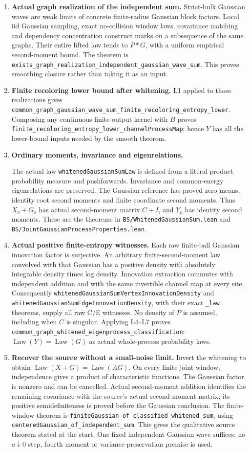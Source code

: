 \documentclass[11pt]{article}
\newcommand{\Law}{\operatorname{Law}}
\newcommand{\lean}[1]{{\small\nolinkurl{#1}}}
\begin{document}
\begin{enumerate}
\item \textbf{Actual graph realization of the independent sum.}
Strict-bulk Gaussian waves are weak limits of concrete finite-radius
Gaussian block factors. Local iid Gaussian sampling, exact no-collision
window laws, covariance matching and dependency concentration construct
marks on a subsequence of the same graphs. Their entire lifted law tends
to $P*G$, with a uniform empirical second-moment bound. The theorem is
\lean{exists_graph_realization_independent_gaussian_wave_sum}. This proves
smoothing closure rather than taking it as an input.
\item \textbf{Finite recoloring lower bound after whitening.}
L1 applied to those realizations gives
\lean{common_graph_gaussian_wave_sum_finite_recoloring_entropy_lower}.
Composing any continuous finite-output kernel with $B$ proves
\lean{finite_recoloring_entropy_lower_channelProcessMap}; hence $Y$ has
all the lower-bound inputs needed by the smooth theorem.
\item \textbf{Ordinary moments, invariance and eigenrelations.}\par
The actual law \lean{whitenedGaussianSumLaw} is defined from a literal
product probability measure and pushforwards. Invariance and common-energy
eigenrelations are preserved. The Gaussian reference has proved zero means,
identity root second moments and finite coordinate second moments. Thus
$X_o+G_o$ has actual second-moment matrix $C+I$, and $Y_o$ has identity
second moments. These are the theorems in
\lean{BS/WhitenedGaussianSum.lean} and
\lean{BS/JointGaussianProcessProperties.lean}.
\item \textbf{Actual positive finite-entropy witnesses.}
Each raw finite-ball Gaussian innovation factor is surjective. An arbitrary
finite-second-moment law convolved with that Gaussian has a positive density
with absolutely integrable density times log density. Innovation extraction
commutes with independent addition and with the same invertible channel
map at every site. Consequently
\lean{whitenedGaussianSumVertexInnovationDensity} and
\lean{whitenedGaussianSumEdgeInnovationDensity}, with their exact
\lean{_law} theorems, supply all raw C/E witnesses. No density of $P$ is
assumed, including when $C$ is singular. Applying L4--L7 proves
\lean{common_graph_whitened_eigenprocess_classification}:
$\Law(Y)=\Law(G)$ as actual whole-process probability laws.
\item \textbf{Recover the source without a small-noise limit.}
Invert the whitening to obtain $\Law(X+G)=\Law(AG)$. On every finite joint
window, independence gives a product of characteristic functions. The
Gaussian factor is nonzero and can be cancelled. Actual second-moment
addition identifies the remaining covariance with the source's actual
second-moment matrix; its positive semidefiniteness is proved before the
Gaussian conclusion. The finite-window theorem is
\lean{finiteGaussian_of_classified_whitened_sum}, using
\lean{centeredGaussian_of_independent_sum}. This gives the qualitative
source theorem stated at the start. One fixed independent Gaussian wave
suffices; no $a\downarrow0$ step, fourth moment or variance-preservation
premise is used.
\end{enumerate}
\end{document}
